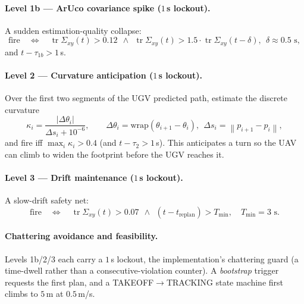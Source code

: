 \documentclass[11pt]{article}
\DeclareMathOperator{\tr}{tr}
\newcommand{\norm}[1]{\left\lVert #1 \right\rVert}
\begin{document}
\paragraph{Level 1b --- ArUco covariance spike ($1$\,s lockout).} A sudden estimation-quality collapse:
\begin{equation}
\text{fire}\quad\Longleftrightarrow\quad
\tr\Sigma_{xy}(t) > 0.12 \ \ \wedge\ \ \tr\Sigma_{xy}(t) > 1.5\cdot\tr\Sigma_{xy}(t-\delta),\ \ \delta\approx0.5\text{ s},
\label{eq:trig1b}
\end{equation}
and $t-\tau_{1b}>1$\,s.

\paragraph{Level 2 --- Curvature anticipation ($1$\,s lockout).} Over the first two segments of the UGV
predicted path, estimate the discrete curvature
\begin{equation}
\kappa_i = \frac{|\Delta\theta_i|}{\Delta s_i + 10^{-6}},\qquad
\Delta\theta_i = \mathrm{wrap}(\theta_{i+1}-\theta_i),\ \ \Delta s_i=\norm{p_{i+1}-p_i},
\label{eq:curv}
\end{equation}
and fire iff $\max_i\kappa_i > 0.4$ (and $t-\tau_2>1$\,s). This anticipates a turn so the UAV can climb to
widen the footprint before the UGV reaches it.

\paragraph{Level 3 --- Drift maintenance ($1$\,s lockout).} A slow-drift safety net:
\begin{equation}
\text{fire}\quad\Longleftrightarrow\quad \tr\Sigma_{xy}(t)>0.07 \ \ \wedge\ \ (t-t_{\text{replan}})>T_{\min},
\quad T_{\min}=3\text{ s}.
\label{eq:trig3}
\end{equation}

\paragraph{Chattering avoidance and feasibility.} Levels 1b/2/3 each carry a $1$\,s lockout, the
implementation's chattering guard (a time-dwell rather than a consecutive-violation counter). A
\emph{bootstrap} trigger requests the first plan, and a TAKEOFF$\to$TRACKING state machine first climbs to
$5$\,m at $0.5$\,m/s.
\end{document}
